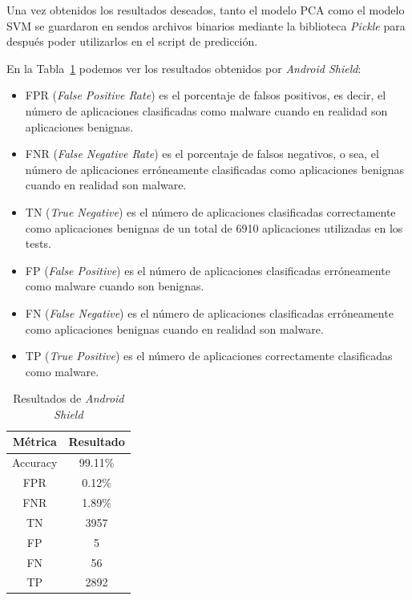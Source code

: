 Una vez obtenidos los resultados deseados, tanto el modelo PCA como el modelo SVM se guardaron en sendos archivos binarios mediante la biblioteca \textit{Pickle} para después poder utilizarlos en el script de predicción.

En la Tabla~\ref{tab:metricas} podemos ver los resultados obtenidos por \textit{Android Shield}:

\begin{itemize}
	\item FPR (\textit{False Positive Rate}) es el porcentaje de falsos positivos, es decir, el número de aplicaciones clasificadas como malware cuando en realidad son aplicaciones benignas.
	\item FNR (\textit{False Negative Rate}) es el porcentaje de falsos negativos, o sea, el número de aplicaciones erróneamente clasificadas como aplicaciones benignas cuando en realidad son malware.
	\item TN (\textit{True Negative}) es el número de aplicaciones clasificadas correctamente como aplicaciones benignas de un total de 6910 aplicaciones utilizadas en los tests.
	\item FP (\textit{False Positive}) es el número de aplicaciones clasificadas erróneamente como malware cuando son benignas.
	\item FN (\textit{False Negative}) es el número de aplicaciones clasificadas erróneamente como aplicaciones benignas cuando en realidad son malware.
	\item TP (\textit{True Positive}) es el número de aplicaciones correctamente clasificadas como malware.
\end{itemize}

\begin{table}[H]
\centering
\begin{tabular}{|c|c|}
\hline
\textbf{Métrica} & \textbf{Resultado}  \\ \hline
Accuracy & 99.11\% \\ \hline
FPR & 0.12\% \\ \hline
FNR & 1.89\% \\ \hline
TN & 3957 \\ \hline
FP & 5 \\ \hline
FN & 56 \\ \hline
TP & 2892 \\ \hline
\end{tabular}
\caption{Resultados de \textit{Android Shield}}
\label{tab:metricas}
\end{table}

